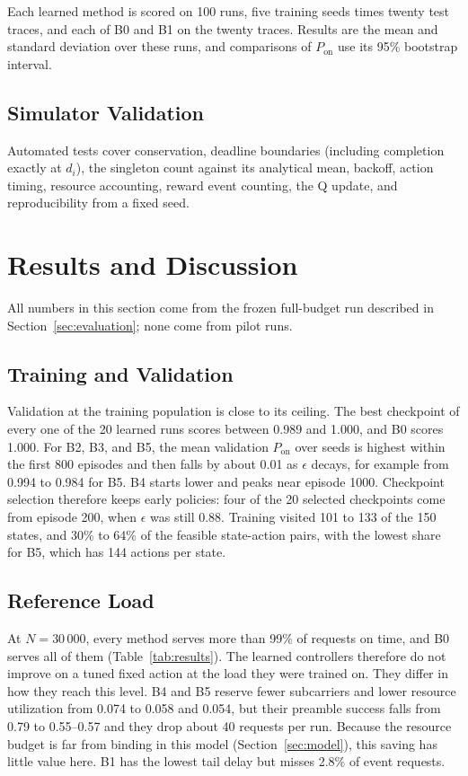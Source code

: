 \documentclass[conference]{IEEEtran}
\begin{document}
Each learned method is scored on 100 runs, five training seeds times twenty test
traces, and each of B0 and B1 on the twenty traces. Results are the mean and standard
deviation over these runs, and comparisons of $P_{\mathrm{on}}$ use its 95\% bootstrap
interval.

\subsection{Simulator Validation}
Automated tests cover conservation, deadline boundaries (including completion exactly
at $d_i$), the singleton count against its analytical mean, backoff, action timing,
resource accounting, reward event counting, the Q update, and reproducibility from a
fixed seed.

\section{Results and Discussion}
\label{sec:results}
All numbers in this section come from the frozen full-budget run described in
Section~\ref{sec:evaluation}; none come from pilot runs.

\subsection{Training and Validation}
Validation at the training population is close to its ceiling. The best checkpoint of
every one of the 20 learned runs scores between 0.989 and 1.000, and B0 scores 1.000.
For B2, B3, and B5, the mean validation $P_{\mathrm{on}}$ over seeds is highest within
the first 800 episodes and then falls by about 0.01 as $\epsilon$ decays, for example
from 0.994 to 0.984 for B5. B4 starts lower and peaks near episode 1000. Checkpoint
selection therefore keeps early policies: four of the 20 selected checkpoints come
from episode 200, when $\epsilon$ was still 0.88. Training visited 101 to 133 of the 150 states, and 30\% to 64\% of
the feasible state-action pairs, with the lowest share for B5, which has 144 actions
per state.

\subsection{Reference Load}
At $N = 30\,000$, every method serves more than 99\% of requests on time,
and B0 serves all of them (Table~\ref{tab:results}). The learned controllers
therefore do not improve on a tuned fixed action at the load they were trained on.
They differ in how they reach this level. B4 and B5 reserve fewer subcarriers and
lower resource utilization from 0.074 to 0.058 and 0.054, but their preamble success
falls from 0.79 to 0.55--0.57 and they drop about 40 requests per run. Because the
resource budget is far from binding in this model (Section~\ref{sec:model}), this
saving has little value here. B1 has the lowest tail delay but misses 2.8\% of event
requests.
\end{document}
